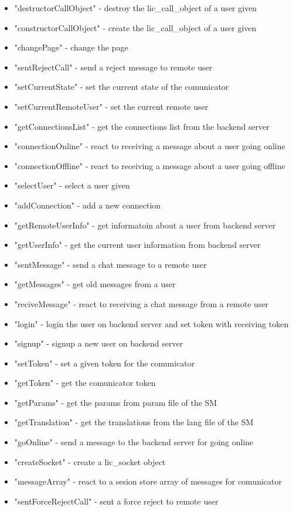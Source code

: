\begin{itemize}
            \item "destructorCallObject" - destroy the lic_call_object of a user given
            \item "constructorCallObject" - create the lic_call_object of a user given
            \item "changePage" - change the page
            \item "sentRejectCall" - send a reject message to remote user
            \item "setCurrentState" - set the current state of the comunicator
            \item "setCurrentRemoteUser" - set the current remote user
            \item "getConnectionsList" - get the connections list from the backend server
            \item "connectionOnline" - react to receiving a message about a user going online
            \item "connectionOffline" - react to receiving a message about a user going offline
            \item "selectUser" - select a user given
            \item "addConnection" - add a new connection
            \item "getRemoteUserInfo" - get informatoin about a user from backend server
            \item "getUserInfo" - get the current user information from backend server
            \item "sentMessage" - send a chat message to a remote user
            \item "getMessages" - get old messages from a user 
            \item "reciveMessage" - react to receiving a chat message from a remote user
            \item "login" - login the user on backend server and set token with receiving token
            \item "signup" - signup a new user on backend server
            \item "setToken" - set a given token for the comunicator
            \item "getToken" - get the comunicator token
            \item "getParams" - get the params from param file of the SM
            \item "getTranslation" - get the translations from the lang file of the SM
            \item "goOnline" - send a message to the backend server for going online
            \item "createSocket" - create a lic_socket object
            \item "messageArray" - react to a sesion store array of messages for comunicator
            \item "sentForceRejectCall" - sent a force reject to remote user
\end{itemize}

